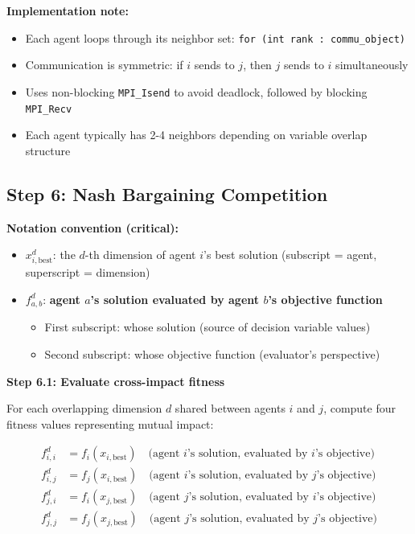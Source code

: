 \documentclass[11pt,a4paper]{article}
\begin{document}
\textbf{Implementation note:}
\begin{itemize}
    \item Each agent loops through its neighbor set: \texttt{for (int rank : commu\_object)}
    \item Communication is symmetric: if $i$ sends to $j$, then $j$ sends to $i$ simultaneously
    \item Uses non-blocking \texttt{MPI\_Isend} to avoid deadlock, followed by blocking \texttt{MPI\_Recv}
    \item Each agent typically has 2-4 neighbors depending on variable overlap structure
\end{itemize}

\subsection{Step 6: Nash Bargaining Competition}

\textbf{Notation convention (critical):}
\begin{itemize}
    \item $x_{i,\text{best}}^d$: the $d$-th dimension of agent $i$'s best solution (subscript = agent, superscript = dimension)
    \item $f_{a,b}^d$: \textbf{agent $a$'s solution evaluated by agent $b$'s objective function}
    \begin{itemize}
        \item First subscript: whose solution (source of decision variable values)
        \item Second subscript: whose objective function (evaluator's perspective)
    \end{itemize}
\end{itemize}

\textbf{Step 6.1: Evaluate cross-impact fitness}

For each overlapping dimension $d$ shared between agents $i$ and $j$, compute four fitness values representing mutual impact:

\begin{align}
f_{i,i}^d &= f_i(x_{i,\text{best}}) \quad \text{(agent } i\text{'s solution, evaluated by } i\text{'s objective)} \\
f_{i,j}^d &= f_j(x_{i,\text{best}}) \quad \text{(agent } i\text{'s solution, evaluated by } j\text{'s objective)} \\
f_{j,i}^d &= f_i(x_{j,\text{best}}) \quad \text{(agent } j\text{'s solution, evaluated by } i\text{'s objective)} \\
f_{j,j}^d &= f_j(x_{j,\text{best}}) \quad \text{(agent } j\text{'s solution, evaluated by } j\text{'s objective)}
\end{align}
\end{document}
